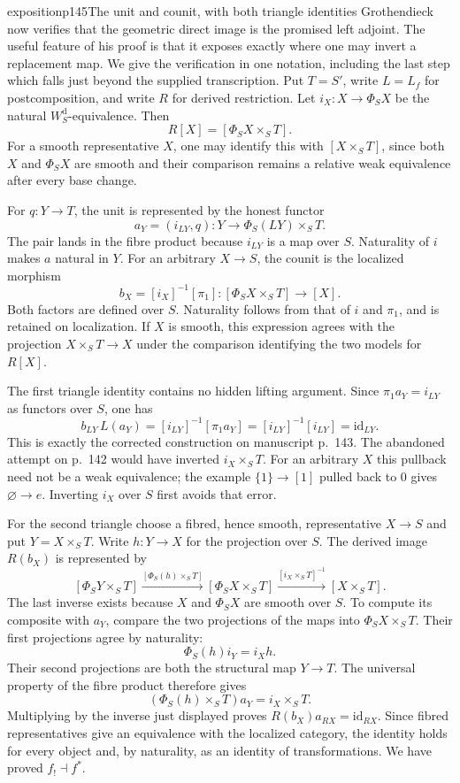 \begin{dcomment}{exposition}{p145}{The unit and counit, with both triangle identities}
Grothendieck now verifies that the geometric direct image is the promised left adjoint. The useful feature of his proof is that it exposes exactly where one may invert a replacement map. We give the verification in one notation, including the last step which falls just beyond the supplied transcription. Put $T=S'$, write $L=L_f$ for postcomposition, and write $R$ for derived restriction. Let $i_X:X\to\Phi_SX$ be the natural $W_S^{\mathrm d}$-equivalence. Then
\[
 R[X]=[\Phi_SX\times_ST].
\]
For a smooth representative $X$, one may identify this with $[X\times_ST]$, since both $X$ and $\Phi_SX$ are smooth and their comparison remains a relative weak equivalence after every base change.

For $q:Y\to T$, the unit is represented by the honest functor
\[
 a_Y=(i_{LY},q):Y\longrightarrow\Phi_S(LY)\times_ST.
\]
The pair lands in the fibre product because $i_{LY}$ is a map over $S$. Naturality of $i$ makes $a$ natural in $Y$. For an arbitrary $X\to S$, the counit is the localized morphism
\[
 b_X=[i_X]^{-1}[\pi_1]:[\Phi_SX\times_ST]\longrightarrow[X].
\]
Both factors are defined over $S$. Naturality follows from that of $i$ and $\pi_1$, and is retained on localization. If $X$ is smooth, this expression agrees with the projection $X\times_ST\to X$ under the comparison identifying the two models for $R[X]$.

The first triangle identity contains no hidden lifting argument. Since $\pi_1a_Y=i_{LY}$ as functors over $S$, one has
\[
 b_{LY}\,L(a_Y)=[i_{LY}]^{-1}[\pi_1a_Y]
  =[i_{LY}]^{-1}[i_{LY}]=\mathrm{id}_{LY}.
\]
This is exactly the corrected construction on manuscript p.~143. The abandoned attempt on p.~142 would have inverted $i_X\times_ST$. For an arbitrary $X$ this pullback need not be a weak equivalence; the example $\{1\}\to[1]$ pulled back to $0$ gives $\varnothing\to e$. Inverting $i_X$ over $S$ first avoids that error.

For the second triangle choose a fibred, hence smooth, representative $X\to S$ and put $Y=X\times_ST$. Write $h:Y\to X$ for the projection over $S$. The derived image $R(b_X)$ is represented by
\[
 [\Phi_S Y\times_ST]
 \xrightarrow{[\Phi_S(h)\times_ST]}
 [\Phi_S X\times_ST]
 \xrightarrow{[i_X\times_ST]^{-1}}
 [X\times_ST].
\]
The last inverse exists because $X$ and $\Phi_SX$ are smooth over $S$. To compute its composite with $a_Y$, compare the two projections of the maps into $\Phi_SX\times_ST$. Their first projections agree by naturality:
\[
 \Phi_S(h)i_Y=i_Xh.
\]
Their second projections are both the structural map $Y\to T$. The universal property of the fibre product therefore gives
\[
 (\Phi_S(h)\times_ST)a_Y=i_X\times_ST.
\]
Multiplying by the inverse just displayed proves $R(b_X)a_{RX}=\mathrm{id}_{RX}$. Since fibred representatives give an equivalence with the localized category, the identity holds for every object and, by naturality, as an identity of transformations. We have proved $f_!\dashv f^*$.


\end{dcomment}
